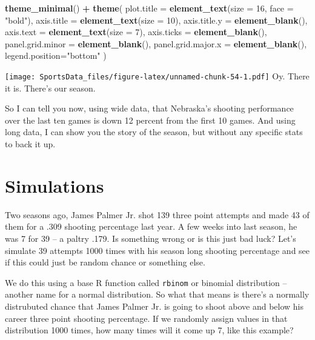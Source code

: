 \documentclass[]{book}
\newenvironment{Shaded}{\begin{snugshade}}{\end{snugshade}}
\newcommand{\KeywordTok}[1]{\textcolor[rgb]{0.13,0.29,0.53}{\textbf{#1}}}
\newcommand{\DataTypeTok}[1]{\textcolor[rgb]{0.13,0.29,0.53}{#1}}
\newcommand{\DecValTok}[1]{\textcolor[rgb]{0.00,0.00,0.81}{#1}}
\newcommand{\StringTok}[1]{\textcolor[rgb]{0.31,0.60,0.02}{#1}}
\newcommand{\OperatorTok}[1]{\textcolor[rgb]{0.81,0.36,0.00}{\textbf{#1}}}
\newcommand{\NormalTok}[1]{#1}
\begin{document}
\begin{Shaded}
\begin{Highlighting}[]
\StringTok{  }\KeywordTok{theme_minimal}\NormalTok{() }\OperatorTok{+}\StringTok{ }
\StringTok{  }\KeywordTok{theme}\NormalTok{(}
    \DataTypeTok{plot.title =} \KeywordTok{element_text}\NormalTok{(}\DataTypeTok{size =} \DecValTok{16}\NormalTok{, }\DataTypeTok{face =} \StringTok{"bold"}\NormalTok{),}
    \DataTypeTok{axis.title =} \KeywordTok{element_text}\NormalTok{(}\DataTypeTok{size =} \DecValTok{10}\NormalTok{),}
    \DataTypeTok{axis.title.y =} \KeywordTok{element_blank}\NormalTok{(),}
    \DataTypeTok{axis.text =} \KeywordTok{element_text}\NormalTok{(}\DataTypeTok{size =} \DecValTok{7}\NormalTok{),}
    \DataTypeTok{axis.ticks =} \KeywordTok{element_blank}\NormalTok{(),}
    \DataTypeTok{panel.grid.minor =} \KeywordTok{element_blank}\NormalTok{(),}
    \DataTypeTok{panel.grid.major.x =} \KeywordTok{element_blank}\NormalTok{(),}
    \DataTypeTok{legend.position=}\StringTok{"bottom"}
\NormalTok{  )}
\end{Highlighting}
\end{Shaded}

\texttt{[image: SportsData\_files/figure-latex/unnamed-chunk-54-1.pdf]}
Oy. There it is. There's our season.

So I can tell you now, using wide data, that Nebraska's shooting
performance over the last ten games is down 12 percent from the first 10
games. And using long data, I can show you the story of the season, but
without any specific stats to back it up.

\chapter{Simulations}\label{simulations}

Two seasons ago, James Palmer Jr. shot 139 three point attempts and made
43 of them for a .309 shooting percentage last year. A few weeks into
last season, he was 7 for 39 -- a paltry .179. Is something wrong or is
this just bad luck? Let's simulate 39 attempts 1000 times with his
season long shooting percentage and see if this could just be random
chance or something else.

We do this using a base R function called \texttt{rbinom} or binomial
distribution -- another name for a normal distribution. So what that
means is there's a normally distrubuted chance that James Palmer Jr. is
going to shoot above and below his career three point shooting
percentage. If we randomly assign values in that distribution 1000
times, how many times will it come up 7, like this example?
\end{document}
